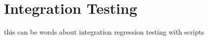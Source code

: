 %
%
\section{Integration Testing}
\label{sec:integrate}

this can be words about integration regression testing with scripts

%
%
